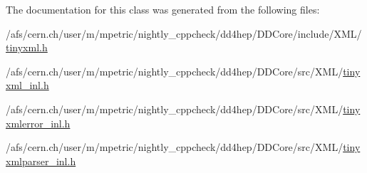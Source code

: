 The documentation for this class was generated from the following files\+:\begin{DoxyCompactItemize}
\item 
/afs/cern.\+ch/user/m/mpetric/nightly\+\_\+cppcheck/dd4hep/\+D\+D\+Core/include/\+X\+M\+L/\hyperlink{tinyxml_8h}{tinyxml.\+h}\item 
/afs/cern.\+ch/user/m/mpetric/nightly\+\_\+cppcheck/dd4hep/\+D\+D\+Core/src/\+X\+M\+L/\hyperlink{tinyxml__inl_8h}{tinyxml\+\_\+inl.\+h}\item 
/afs/cern.\+ch/user/m/mpetric/nightly\+\_\+cppcheck/dd4hep/\+D\+D\+Core/src/\+X\+M\+L/\hyperlink{tinyxmlerror__inl_8h}{tinyxmlerror\+\_\+inl.\+h}\item 
/afs/cern.\+ch/user/m/mpetric/nightly\+\_\+cppcheck/dd4hep/\+D\+D\+Core/src/\+X\+M\+L/\hyperlink{tinyxmlparser__inl_8h}{tinyxmlparser\+\_\+inl.\+h}\end{DoxyCompactItemize}
